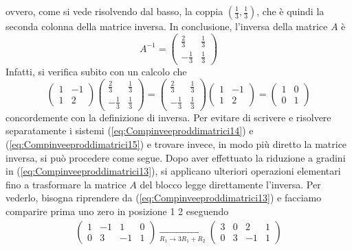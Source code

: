 \documentclass{book}
\theoremstyle{definition}
\theoremstyle{plain}
\begin{document}
ovvero, come si vede risolvendo dal basso, la coppia
$\left(\frac{1}{3},\frac{1}{3}\right)$, che è quindi la seconda
colonna della matrice inversa. In conclusione, l'inversa della
matrice $A$ è
\begin{equation*}
  A^{-1}=
  \begin{pmatrix}
    \frac{2}{3} & \frac{1}{3}\\
    -\frac{1}{3} & \frac{1}{3}
  \end{pmatrix}
\end{equation*}
Infatti, si verifica subito con un calcolo che
\begin{equation*}
  \begin{pmatrix}
    1 & -1\\
    1 & 2
  \end{pmatrix}
  \begin{pmatrix}
    \frac{2}{3} & \frac{1}{3}\\
    -\frac{1}{3} & \frac{1}{3}
  \end{pmatrix}=\begin{pmatrix}
    \frac{2}{3} & \frac{1}{3}\\
    -\frac{1}{3} & \frac{1}{3}
  \end{pmatrix}\begin{pmatrix}
    1 & -1\\
    1 & 2
  \end{pmatrix}=
  \begin{pmatrix}
    1 & 0\\
    0 & 1
  \end{pmatrix}
\end{equation*}
concordemente con la definizione di inversa.
Per evitare di scrivere e risolvere separatamente i sistemi
(\ref{eq:Compinveeproddimatrici14}) e 
(\ref{eq:Compinveeproddimatrici15}) e trovare invece, in modo
più diretto la matrice inversa, si può procedere come segue. Dopo
aver effettuato la riduzione a gradini in
(\ref{eq:Compinveeproddimatrici13}), si applicano ulteriori
operazioni elementari fino a trasformare la matrice $A$ del blocco
legge direttamente l'inversa. Per vederlo, bisogna riprendere da 
(\ref{eq:Compinveeproddimatrici13}) e facciamo comparire prima
uno zero in posizione 1 2 eseguendo
\begin{eqnarray*}  
  \left(
  \begin{array}{cc|cc}
    1 & -1 & 1 & 0 \\
    0 & 3 & -1 & 1
  \end{array}\right) \underset{R_1\to 3R_1+R_2}{\to}\left(
  \begin{array}{cc|cc}
    3 & 0 & 2 & 1\\
    0 & 3 & -1 & 1
  \end{array}\right)
\end{eqnarray*}
\end{document}
